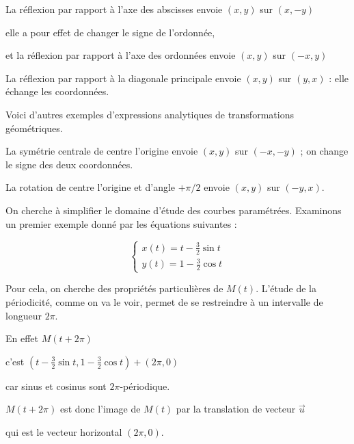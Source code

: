 \change
La réflexion par rapport à l'axe des abscisses envoie $(x,y)$ sur $(x,-y)$

\change
elle a pour effet de changer le signe de l'ordonnée, 

\change
et la réflexion par rapport à l'axe des ordonnées envoie $(x,y)$ sur $(-x,y)$

\change
La réflexion par rapport à la diagonale principale 
envoie $(x,y)$ sur $(y,x)$ : elle échange les coordonnées.



\diapo

Voici d'autres exemples d'expressions analytiques de transformations géométriques.

\change

La symétrie centrale de centre l'origine envoie $(x,y)$ sur $(-x,-y)$ ;
on change le signe des deux coordonnées.


\change
\change

La rotation de centre l'origine et d'angle $+\pi/2$ 
envoie $(x,y)$ sur $(-y,x)$.



\diapo



On cherche à simplifier 
le domaine d'étude des courbes paramétrées.
Examinons un premier exemple 
donné par les équations suivantes :

$$\left\{
\begin{array}{l}
x(t)=t-\frac32\sin t\\
y(t)=1-\frac32\cos t
\end{array}
\right.$$

\change

Pour cela, on cherche des propriétés particulières de $M(t)$. 
L'étude de la périodicité, comme on va le voir, 
permet de se restreindre à un intervalle de longueur $2\pi$. 

En effet $M(t+2\pi)$

\change
c'est
$(t-\tfrac32\sin t,1-\tfrac32\cos t)+(2\pi,0)$

car sinus et cosinus sont $2\pi$-périodique.

\change
$M(t+2\pi)$ est donc l'image de $M(t)$ par la translation de vecteur $\vec{u}$

qui est le vecteur horizontal $(2\pi,0)$.

